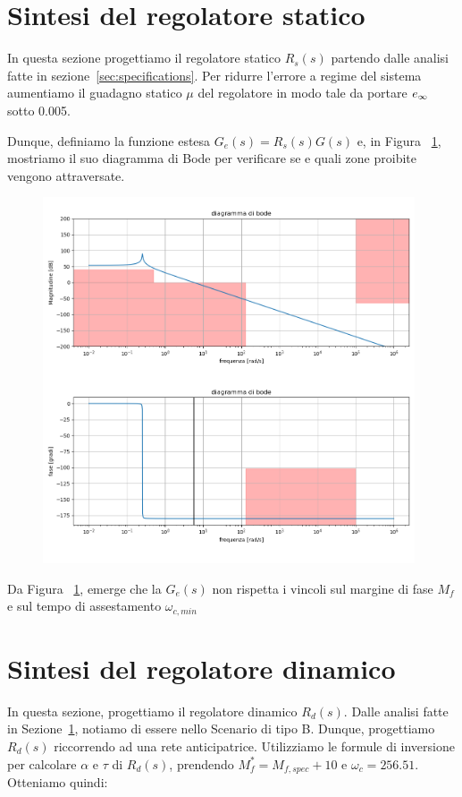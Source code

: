 \documentclass[a4paper, 11pt]{article}
\begin{document}
\section{Sintesi del regolatore statico}
\label{sec:static_regulator}

In questa sezione progettiamo il regolatore statico $R_s(s)$ partendo dalle analisi fatte in sezione~\ref{sec:specifications}.
Per ridurre l'errore a regime del sistema aumentiamo il guadagno statico $\mu$ del regolatore in modo tale da portare $e_\infty \space $ sotto 0.005.

Dunque, definiamo la funzione estesa $G_e(s) = R_s(s)G(s)$ e, in Figura ~\ref{Figura3}, mostriamo il suo diagramma di Bode per verificare se e quali zone proibite vengono attraversate.
\begin{figure}[H]
    \centering
\includegraphics[width=110mm]{figs/bode_Ge.png}
    \caption{}
    \label{Figura3}
\end{figure}
Da Figura ~\ref{Figura3}, emerge che la $G_e(s)$ non rispetta i vincoli sul margine di fase $M_f$ e sul tempo di assestamento $\omega_{c,min}$


\section{Sintesi del regolatore dinamico}

In questa sezione, progettiamo il regolatore dinamico $R_d(s)$. 
%
Dalle analisi fatte in Sezione~\ref{sec:static_regulator}, notiamo di essere nello Scenario di tipo B. Dunque, progettiamo $R_d(s)$ riccorrendo ad una rete anticipatrice. Utilizziamo le formule di inversione per calcolare $\alpha$ e $\tau$ di $R_d(s)$, prendendo $M_f^*=M_{f,spec}+10$ e $\omega_c=256.51$. Otteniamo quindi:
\end{document}
